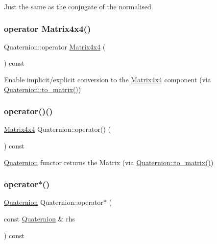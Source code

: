 Just the same as the conjugate of the normalised. \mbox{\label{class_quaternion_a31f2b4a704b8ba5b677d0cf7ecec163d}} 
\subsubsection{\texorpdfstring{operator Matrix4x4()}{operator Matrix4x4()}}
{\footnotesize\ttfamily Quaternion\+::operator \mbox{\hyperlink{class_matrix4x4}{Matrix4x4}} (\begin{DoxyParamCaption}{ }\end{DoxyParamCaption}) const}

Enable implicit/explicit conversion to the \mbox{\hyperlink{class_matrix4x4}{Matrix4x4}} component (via \mbox{\hyperlink{class_quaternion_ae0309902fc8b7d8aa1f4075a73fee928}{Quaternion\+::to\+\_\+matrix()}}) \mbox{\label{class_quaternion_afe406f4a387794c924b0459b9514c68d}} 
\subsubsection{\texorpdfstring{operator()()}{operator()()}}
{\footnotesize\ttfamily \mbox{\hyperlink{class_matrix4x4}{Matrix4x4}} Quaternion\+::operator() (\begin{DoxyParamCaption}{ }\end{DoxyParamCaption}) const}

\mbox{\hyperlink{class_quaternion}{Quaternion}} functor returns the Matrix (via \mbox{\hyperlink{class_quaternion_ae0309902fc8b7d8aa1f4075a73fee928}{Quaternion\+::to\+\_\+matrix()}}) \mbox{\label{class_quaternion_a7cc9bf508bfd8d521a0d246a2cb47194}} 
\subsubsection{\texorpdfstring{operator$\ast$()}{operator*()}\hspace{0.1cm}{\footnotesize\ttfamily [1/2]}}
{\footnotesize\ttfamily \mbox{\hyperlink{class_quaternion}{Quaternion}} Quaternion\+::operator$\ast$ (\begin{DoxyParamCaption}\item[{const \mbox{\hyperlink{class_quaternion}{Quaternion}} \&}]{rhs }\end{DoxyParamCaption}) const}

